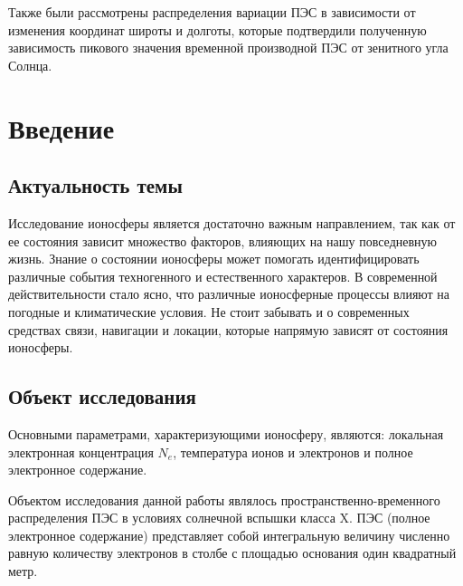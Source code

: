 \documentclass[a4paper]{article}
\begin{document}
Также были рассмотрены распределения вариации ПЭС  в зависимости от изменения координат широты и долготы, которые подтвердили полученную зависимость пикового значения временной производной ПЭС от зенитного угла Солнца. 


\newpage
\tableofcontents

\newpage

\newpage
\section*{Введение}
\subsection*{Актуальность темы}
Исследование ионосферы является достаточно важным направлением, так как от ее состояния зависит множество факторов, влияющих на нашу повседневную жизнь. Знание о состоянии ионосферы может помогать идентифицировать различные события техногенного и естественного характеров. В современной действительности стало ясно, что различные ионосферные процессы влияют на погодные и климатические условия. Не стоит забывать и о современных средствах связи, навигации и локации, которые напрямую зависят от состояния ионосферы.

\subsection*{Объект исследования}
Основными параметрами, характеризующими ионосферу, являются: локальная электронная концентрация $N_e$, температура ионов и электронов и полное электронное содержание.

Объектом исследования данной работы являлось пространственно-временного распределения ПЭС в условиях солнечной вспышки класса X.  
ПЭС (полное электронное содержание) представляет собой интегральную величину численно равную количеству электронов в столбе с площадью основания один квадратный метр.

\end{document}
